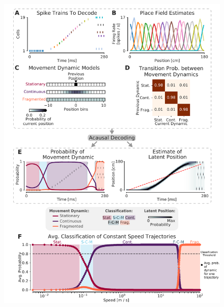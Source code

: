 \documentclass[9pt,lineno]{elife}
\providecommand{\DIFaddbeginFL}{} %
\providecommand{\DIFdelbeginFL}{} %
\providecommand{\DIFdelendFL}{} %
\newcommand{\DIFscaledelfig}{0.5}
\newlength{\DIFdelgraphicswidth} %
\newlength{\DIFdelgraphicsheight} %
\newcommand{\DIFaddincludegraphics}[2][]{{\color{blue}\fbox{\DIFOincludegraphics[#1]{#2}}}} %
\newcommand{\DIFdelincludegraphics}[2][]{%
\sbox{\DIFdelgraphicsbox}{\DIFOincludegraphics[#1]{#2}}%
\settoboxwidth{\DIFdelgraphicswidth}{\DIFdelgraphicsbox} %
\settoboxtotalheight{\DIFdelgraphicsheight}{\DIFdelgraphicsbox} %
\scalebox{\DIFscaledelfig}{%
\parbox[b]{\DIFdelgraphicswidth}{\usebox{\DIFdelgraphicsbox}\\[-\baselineskip] \rule{\DIFdelgraphicswidth}{0em}}\llap{\resizebox{\DIFdelgraphicswidth}{\DIFdelgraphicsheight}{%
\setlength{\unitlength}{\DIFdelgraphicswidth}%
\begin{picture}(1,1)%
\thicklines\linethickness{2pt} %
{\color[rgb]{1,0,0}\put(0,0){\framebox(1,1){}}}%
{\color[rgb]{1,0,0}\put(0,0){\line( 1,1){1}}}%
{\color[rgb]{1,0,0}\put(0,1){\line(1,-1){1}}}%
\end{picture}%
}\hspace*{3pt}}} %
} %
\DeclareRobustCommand{\DIFaddbeginFL}{\DIFOaddbeginFL \let\includegraphics\DIFaddincludegraphics} %
\DeclareRobustCommand{\DIFdelbeginFL}{\DIFOdelbeginFL \let\includegraphics\DIFdelincludegraphics} %
\DeclareRobustCommand{\DIFdelendFL}{\DIFOaddendFL \let\includegraphics\DIFOincludegraphics} %
\begin{document}
\begin{figure}
\DIFdelbeginFL %
\DIFdelendFL \DIFaddbeginFL \includegraphics[width=0.75\linewidth]{figures/Figure1/Figure1_v7}

\end{figure}
\end{document}
